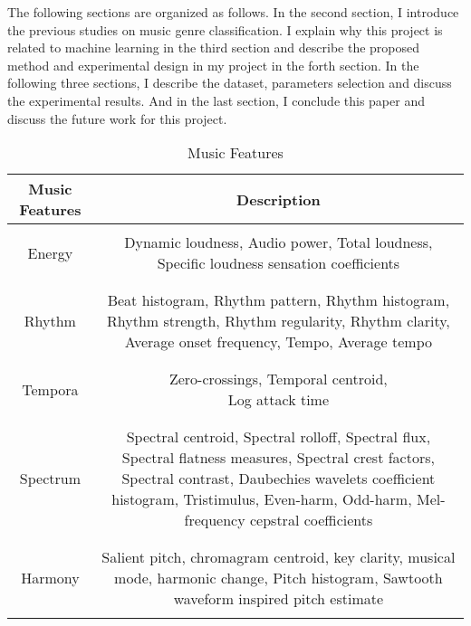 \documentclass{article} %
\begin{document}
The following sections are organized as follows. In the second section, I introduce the previous studies on music genre classification. I explain why this project is related to machine learning in the third section and describe the proposed method and experimental design in my project in the forth section. In the following three sections, I describe the dataset, parameters selection and discuss the experimental results. And in the last section, I conclude this paper and discuss the future work for this project.
\begin{table}[ht]
	\caption{Music Features}
	\label{Music Features}
	\begin{center}
		\begin{tabular}{c|c}
			\multicolumn{1}{c}{\bf Music Features}  &\multicolumn{1}{c}{\bf Description} 
			\\ \hline \\
			Energy         & \parbox{8cm}{Dynamic loudness, Audio power, Total loudness, \\ Specific loudness sensation coefficients}\\ \\
			\hline \\
			Rhythm         & \parbox{8cm}{Beat histogram, Rhythm pattern, Rhythm histogram, \\                Rhythm strength, Rhythm regularity, Rhythm clarity, \\ 
				Average onset frequency, Tempo, Average tempo} \\ \\
			\hline \\                
			Tempora             & \parbox{8cm}{Zero-crossings, Temporal centroid, \\ Log attack
				time \\ } \\ \\
			\hline \\
			Spectrum             &\parbox{8cm}{Spectral centroid, Spectral rolloff, Spectral flux,
				Spectral flatness measures, Spectral crest factors, Spectral contrast, Daubechies wavelets coefficient histogram, Tristimulus, Even-harm,
				Odd-harm, Mel-frequency cepstral coefficients} \\ \\
			\hline \\
			Harmony             &\parbox{8cm}{Salient pitch, chromagram centroid, key clarity,
				musical mode, harmonic change, Pitch histogram, Sawtooth waveform inspired pitch estimate} \\ \\
			\hline
			
		\end{tabular}
	\end{center}
\end{table}
\end{document}
